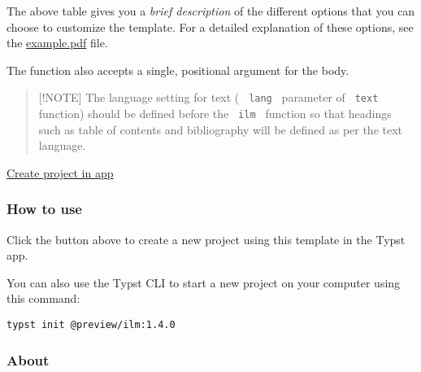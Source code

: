 The above table gives you a \emph{brief description} of the different
options that you can choose to customize the template. For a detailed
explanation of these options, see the
\href{https://github.com/talal/ilm/blob/main/example.pdf}{example.pdf}
file.

The function also accepts a single, positional argument for the body.

\begin{quote}
{[}!NOTE{]} The language setting for text ( \texttt{\ lang\ } parameter
of \texttt{\ text\ } function) should be defined before the
\texttt{\ ilm\ } function so that headings such as table of contents and
bibliography will be defined as per the text language.
\end{quote}

\href{/app?template=ilm&version=1.4.0}{Create project in app}

\subsubsection{How to use}\label{how-to-use}

Click the button above to create a new project using this template in
the Typst app.

You can also use the Typst CLI to start a new project on your computer
using this command:

\begin{verbatim}
typst init @preview/ilm:1.4.0
\end{verbatim}



\subsubsection{About}\label{about}

